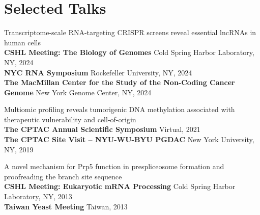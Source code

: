 \documentclass[letterpaper,11pt]{cv}
\begin{document}
\begin{entrylist}
    
    
    \end{entrylist}
    

\section{Selected Talks}
\begin{entrylist}
    \item \small{Transcriptome-scale RNA-targeting CRISPR screens reveal essential lncRNAs in human cells}\\
    \textbf{CSHL Meeting: The Biology of Genomes} \hfill Cold Spring Harbor Laboratory, NY, 2024 \\
    \textbf{NYC RNA Symposium} \hfill Rockefeller University, NY, 2024 \\
    \textbf{The MacMillan Center for the Study of the
    Non-Coding Cancer Genome} \hfill New York Genome Center, NY, 2024
    \item \small{Multiomic profiling reveals tumorigenic DNA methylation associated with therapeutic vulnerability and cell-of-origin}\\ \textbf{The CPTAC Annual Scientific Symposium} \hfill Virtual, 2021 \\
    \textbf{The CPTAC Site Visit – NYU-WU-BYU PGDAC} \hfill New York University, NY, 2019
    \item \small{A novel mechanism for Prp5 function in prespliceosome formation and proofreading the branch site sequence}\\
    \textbf{CSHL Meeting: Eukaryotic mRNA Processing} \hfill Cold Spring Harbor Laboratory, NY, 2013 \\
    \textbf{Taiwan Yeast Meeting} \hfill Taiwan, 2013


\end{entrylist}
\end{document}
